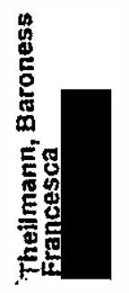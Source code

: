 \documentclass[10pt]{article}
\begin{document}
\includegraphics[max width=\textwidth, center]{2025_02_27_dd68c3d38de88f0516d9g-175}\\
\end{document}
